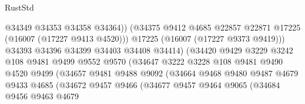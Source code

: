 \begin{lexlean}{RustStd}
\begin{coremodule}
                                        @34349
                                        @34353
                                        @34358
                                        @34364))
                                    (@34375
                                      @9412
                                      @4685
                                      @22857
                                      @22871
                                      @17225
                                      (@16007 (@17227 @9413 @4520)))
                                    @17225
                                    (@16007 (@17227 @9373 @9419)))
                                  @34393
                                  @34396
                                  @34399
                                  @34403
                                  @34408
                                  @34414)
                                (@34420
                                  @9429
                                  @3229
                                  @3242
                                  @108
                                  @9481
                                  @9499
                                  @9552
                                  @9570
                                  (@34647
                                    @3222
                                    @3228
                                    @108
                                    @9481
                                    @9490
                                    @4520
                                    @9499
                                    (@34657
                                      @9481
                                      @9488
                                      @9092
                                      (@34664
                                        @9468
                                        @9480
                                        @9487
                                        @4679
                                        @9433
                                        @4685
                                        (@34672
                                          @9457
                                          @9466
                                          (@34677
                                            @9457
                                            @9464
                                            @9065
                                            (@34684
                                              @9456
                                              @9463
                                              @4679

\end{coremodule}
\end{lexlean}
